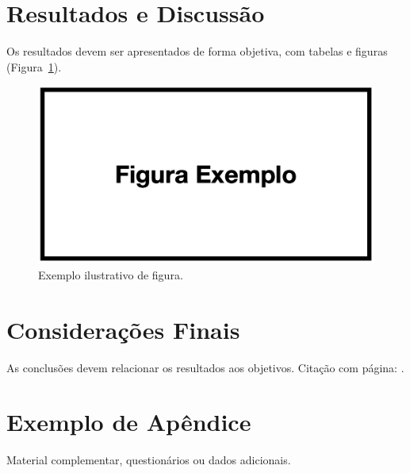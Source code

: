 \documentclass[12pt,oneside]{article}
\begin{document}
\section{Resultados e Discussão}
Os resultados devem ser apresentados de forma objetiva, com tabelas e figuras (Figura~\ref{fig:exemplo}).

\begin{figure}[ht]
  \centering
  \includegraphics[width=.9\textwidth]{figura.png}
  \caption{Exemplo ilustrativo de figura.}
  \label{fig:exemplo}
\end{figure}

\section{Considerações Finais}
As conclusões devem relacionar os resultados aos objetivos.  
Citação com página: \cite[p.~25]{azumaRecentAdvancesAugmentedReality2001}.

\printbibliography

\appendix
\renewcommand{\thesection}{Apêndice \Alph{section}}

\section{Exemplo de Apêndice}
Material complementar, questionários ou dados adicionais.
\end{document}
